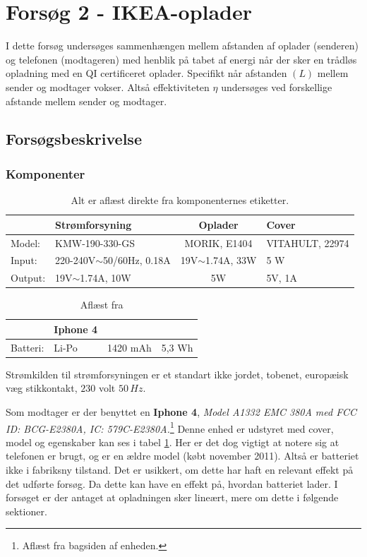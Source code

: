 \section{Forsøg 2 - IKEA-oplader} \label{sec:forsg2}

I dette forsøg undersøges sammenhængen mellem afstanden af oplader (senderen) og telefonen (modtageren) med henblik på tabet af energi når der sker en trådløs opladning med en QI certificeret oplader. Specifikt når afstanden $(L)$ mellem sender og modtager vokser. Altså effektiviteten $\eta$ undersøges ved forskellige afstande mellem sender og modtager.

\subsection{Forsøgsbeskrivelse} 
\subsubsection{Komponenter}

\begin{table}[htbp] %
\begin{tabular}{l|l|c|l}
        & Strømforsyning               & Oplader             & Cover               \\ \hline
Model:  & KMW-190-330-GS               & MORIK, E1404        & VITAHULT, 22974     \\
Input:  & 220-240V$\sim$50/60Hz, 0.18A & 19V$\sim$1.74A, 33W & 5 W       \\	
Output: & 19V$\sim$1.74A, 10W          & 5W                  & 5V, 1A             
\end{tabular}
\caption{Alt er aflæst direkte fra komponenternes etiketter.}
\label{table:sender}
\end{table}


\begin{table}[htbp]
\begin{tabular}{l|lcl}
         & Iphone 4 &          &        \\ \hline
Batteri: & Li-Po     & 1420 mAh & 5,3 Wh
\end{tabular}
\caption{Aflæst fra \cite{batteri}}
\label{table:batteri}
\end{table}

Strømkilden til strømforsyningen er et standart ikke jordet, tobenet, europæisk væg stikkontakt, $230$ volt $50 \, Hz$.

Som modtager er der benyttet en \textbf{Iphone 4}, \textit{Model A1332 EMC 380A med FCC ID: BCG-E2380A, IC: 579C-E2380A.}\footnote{Aflæst fra bagsiden af enheden.}
Denne enhed er udstyret med cover, model og egenskaber kan ses i tabel \ref{table:sender}. Her er det dog vigtigt at notere sig at telefonen er brugt, og er en ældre model (købt november 2011). Altså er batteriet ikke i fabriksny tilstand. Det er usikkert, om dette har haft en relevant effekt på det udførte forsøg. Da dette kan have en effekt på, hvordan batteriet lader. I forsøget er der antaget at opladningen sker lineært, mere om dette i følgende sektioner.


